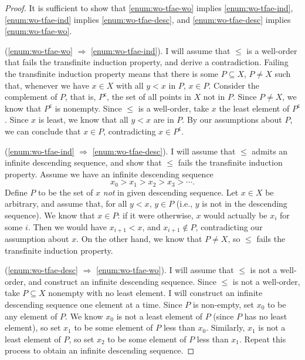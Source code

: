 \documentclass[letterpaper]{article}
\theoremstyle{definition}
\renewcommand{\implies}{\Rightarrow}
\newcommand{\setcomplement}[1]{{{#1}^{\mathsf{c}}}}
\begin{document}
\begin{proof}
  It is sufficient to show that \ref{enum:wo-tfae-wo} implies
  \ref{enum:wo-tfae-ind}, \ref{enum:wo-tfae-ind} implies
  \ref{enum:wo-tfae-desc}, and \ref{enum:wo-tfae-desc} implies
  \ref{enum:wo-tfae-wo}.

  (\ref{enum:wo-tfae-wo} \(\implies\) \ref{enum:wo-tfae-ind}).  I will
  assume that \(\leq\) is a well-order that fails the transfinite
  induction property, and derive a contradiction.  Failing the
  transfinite induction property means that there is some \(P
  \subseteq X\), \(P \neq X\) such that, whenever we have \(x \in X\)
  with all \(y < x\) in \(P\), \(x \in P\).  Consider the complement
  of \(P\), that is, \(\setcomplement{P}\), the set of all points in
  \(X\) not in \(P\).  Since \(P \neq X\), we know that
  \(\setcomplement{P}\) is nonempty.  Since \(\leq\) is a well-order,
  take \(x\) the least element of \(\setcomplement{P}\).  Since \(x\)
  is least, we know that all \(y < x\) are in \(P\).  By our
  assumptions about \(P\), we can conclude that \(x \in P\),
  contradicting \(x \in \setcomplement{P}\).

  (\ref{enum:wo-tfae-ind} \(\implies\) \ref{enum:wo-tfae-desc}).  I
  will assume that \(\leq\) admits an infinite descending sequence,
  and show that \(\leq\) fails the transfinite induction property.
  Assume we have an infinite descending sequence
  \[x_0 > x_1 > x_2 > x_3 > \cdots \text{.}\]
  Define \(P\) to be the set of \(x\) \emph{not} in given descending
  sequence.  Let \(x \in X\) be arbitrary, and assume that, for all
  \(y < x\), \(y \in P\) (i.e., \(y\) is not in the descending
  sequence).  We know that \(x \in P\): if it were otherwise, \(x\)
  would actually be \(x_i\) for some \(i\).  Then we would have
  \(x_{i+1} < x\), and \(x_{i+1} \not\in P\), contradicting our
  assumption about \(x\).  On the other hand, we know that \(P \neq
  X\), so \(\leq\) fails the transfinite induction property.

  (\ref{enum:wo-tfae-desc} \(\implies\) \ref{enum:wo-tfae-wo}).  I
  will assume that \(\leq\) is not a well-order, and construct an
  infinite descending sequence.  Since \(\leq\) is not a well-order,
  take \(P \subseteq X\) nonempty with no least element.  I will
  construct an infinite descending sequence one element at a time.
  Since \(P\) is non-empty, set \(x_0\) to be any element of \(P\).
  We know \(x_0\) is not a least element of \(P\) (since \(P\) has no
  least element), so set \(x_1\) to be some element of \(P\) less than
  \(x_0\).  Similarly, \(x_1\) is not a least element of \(P\), so set
  \(x_2\) to be some element of \(P\) less than \(x_1\).  Repeat this
  process to obtain an infinite descending sequence.
\end{proof}
\end{document}
